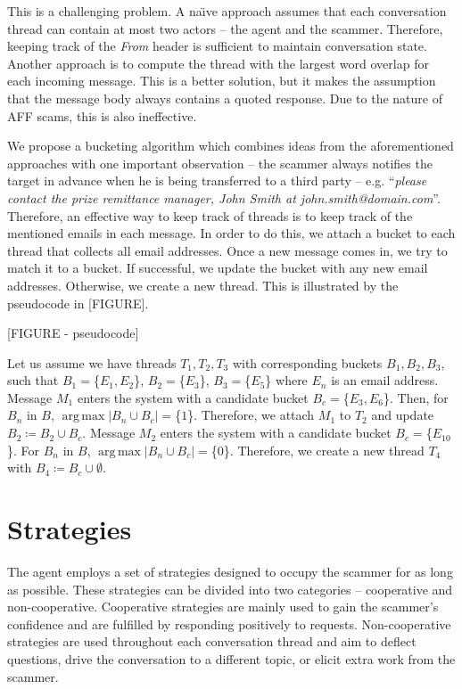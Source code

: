 This is a challenging problem. A na\"{\i}ve approach assumes that each conversation thread can contain at most two actors -- the agent and the scammer. Therefore, keeping track of the \emph{From} header is  sufficient to maintain conversation state. Another approach is to compute the thread with the largest word overlap for each incoming message. This is a better solution, but it makes the assumption that the message body always contains a quoted response. Due to the nature of AFF scams, this is also ineffective.

We propose a bucketing algorithm which combines ideas from the aforementioned approaches with one important observation -- the scammer always notifies the target in advance when he is being transferred to a third party -- e.g. ``\textit{please contact the prize remittance manager, John Smith at john.smith@domain.com}''. Therefore, an effective way to keep track of threads is to keep track of the mentioned emails in each message. In order to do this, we attach a bucket to each thread that collects all email addresses. Once a new message comes in, we try to match it to a bucket. If successful, we update the bucket with any new email addresses. Otherwise, we create a new thread. This is illustrated by the pseudocode in [FIGURE].

[FIGURE - pseudocode]

Let us assume we have threads $T_{1}, T_{2}, T_{3}$ with corresponding buckets $B_{1}, B_{2}, B_{3}$, such that $B_{1} = $\{$E_{1}, E_{2}$\}, $B_{2} = $\{$E_{3}$\}, $B_{3} = $\{$E_{5}$\} where $E_{n}$ is an email address. Message $M_{1}$ enters the system with a candidate bucket $B_{c} = $\{$E_{3}, E_{6}$\}. Then, for $B_{n}$ in $B$, $\operatorname{arg\,max} \left|{B_{n} \cup B_{c}}\right| = $\{$1$\}. Therefore, we attach $M_{1}$ to $T_{2}$ and update $B_{2} \coloneqq B_{2} \cup B_{c}$. Message $M_{2}$ enters the system with a candidate bucket $B_{c} = $\{$E_{10}$\}. For $B_{n}$ in $B$, $\operatorname{arg\,max} \left|{B_{n} \cup B_{c}}\right| = $\{$0$\}. Therefore, we create a new thread $T_{4}$ with $B_{4} \coloneqq B_{c} \cup \emptyset$.

\section{Strategies}
The agent employs a set of strategies designed to occupy the scammer for as long as possible. These strategies can be divided into two categories -- cooperative and non-cooperative. Cooperative strategies are mainly used to gain the scammer's confidence and are fulfilled by responding positively to requests. Non-cooperative strategies are used throughout each conversation thread and aim to deflect questions, drive the conversation to a different topic, or elicit extra work from the scammer.

